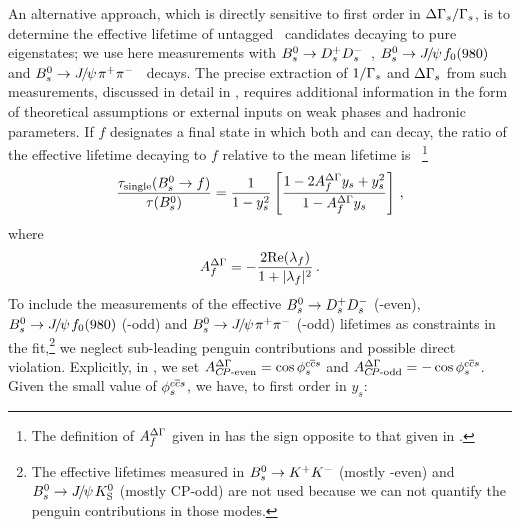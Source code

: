 An alternative approach, which is directly sensitive to first order in 
$\Delta\Gamma_{s}/\Gamma_{s}$, 
is to determine the effective lifetime of untagged \Bs\ candidates
decaying to %
pure \CP eigenstates; we use here measurements with
$B^0_s \to D_s^+D_s^-$~\cite{Aaij:2013bvd}, 
$B^0_s \to {J\mskip -3mu/\mskip -2mu\psi\mskip 2mu} f_0(980)$~\cite{Aaltonen:2011nk}
and $B^0_s\to {J\mskip -3mu/\mskip -2mu\psi\mskip 2mu} \pi^+\pi^-$~\cite{Aaij:2013oba,*LHCb:2011aa_mod,*LHCb:2012ad_mod,*LHCb:2011ab_mod,*Aaij:2012nta_mod} decays.
The precise extraction of $1/\Gamma_{s}$ and $\Delta\Gamma_{s}$
from such measurements, discussed in detail in , 
requires additional information 
in the form of theoretical assumptions or
external inputs on weak phases and hadronic parameters. 
If $f$ designates a final state in which both \Bs and \Bsbar can decay,
the ratio of the effective \Bs lifetime decaying to $f$ relative to the mean
\Bs lifetime is~\cite{Fleischer:2011cw}%
\footnote{
  \label{foot:life_mix:ADG-def}
  The definition of $A_f^{\Delta\Gamma}$ given in  has the sign opposite to that given in .}
\begin{equation}
  \frac{\tau_{\rm single}(\Bs \to f)}{\tau(\Bs)} = \frac{1}{1-y_s^2} \left[ \frac{1 - 2A_f^{\DG} y_s + y_s^2}{1 - A_f^{\DG} y_s}\right ] \,,
\labe{tauf_fleisch}
\end{equation}
where
\begin{equation}
A_f^{\DG} = -\frac{2 \Re(\lambda_f)} {1+|\lambda_f|^2} \,.
\labe{ADG}
\end{equation}
To include the measurements of the effective
$B^0_s \to D_s^+D_s^-$ (\CP-even), $B^0_s \to {J\mskip -3mu/\mskip -2mu\psi\mskip 2mu} f_0(980)$ (\CP-odd) and
$B^0_s \to {J\mskip -3mu/\mskip -2mu\psi\mskip 2mu}\pi^+\pi^-$ (\CP-odd) 
lifetimes as constraints in the \DGs fit,\footnote{%
The effective lifetimes measured in $B^0_s\to K^+ K^-$ (mostly \CP-even) and  $B^0_s \to {J\mskip -3mu/\mskip -2mu\psi\mskip 2mu} K_{\rm S}^0$ (mostly CP-odd) are not used because we can not quantify the penguin contributions in those modes.}
we neglect sub-leading penguin contributions and possible direct \CP violation. 
Explicitly, in , we set
$A_{\mbox{\scriptsize \CP-even}}^{\DG} = \cos \phiccbars$
and $A_{\mbox{\scriptsize \CP-odd}}^{\DG} = -\cos \phiccbars$.
Given the small value of $\phiccbars$, we have, to first order in $y_s$:
